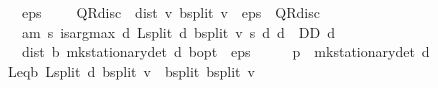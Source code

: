 \begin{isabellebody}
\ \ \ {\isachardoublequoteopen}eps\ {\isachargreater}{\kern0pt}\ {}{\isachardoublequoteclose}\ {\isachardoublequoteopen}{}\ {\isacharasterisk}{\kern0pt}\ QR{\isacharunderscore}{\kern0pt}disc\ {\isacharasterisk}{\kern0pt}\ dist\ v\ {\isacharparenleft}{\kern0pt}{\isasymL}\isactrlsub b{\isacharunderscore}{\kern0pt}split\ v{\isacharparenright}{\kern0pt}\ {\isacharless}{\kern0pt}\ eps\ {\isacharasterisk}{\kern0pt}\ {\isacharparenleft}{\kern0pt}{}{\isacharminus}{\kern0pt}QR{\isacharunderscore}{\kern0pt}disc{\isacharparenright}{\kern0pt}{\isachardoublequoteclose}\isanewline
\ \ \ am{\isacharcolon}{\kern0pt}\ {\isachardoublequoteopen}{\isasymAnd}s{\isachardot}{\kern0pt}\ is{\isacharunderscore}{\kern0pt}arg{\isacharunderscore}{\kern0pt}max\ {\isacharparenleft}{\kern0pt}{\isasymlambda}d{\isachardot}{\kern0pt}\ L{\isacharunderscore}{\kern0pt}split\ d\ {\isacharparenleft}{\kern0pt}{\isasymL}\isactrlsub b{\isacharunderscore}{\kern0pt}split\ v{\isacharparenright}{\kern0pt}\ s{\isacharparenright}{\kern0pt}\ {\isacharparenleft}{\kern0pt}{\isasymlambda}d{\isachardot}{\kern0pt}\ d\ {\isasymin}\ D\isactrlsub D{\isacharparenright}{\kern0pt}\ d{\isachardoublequoteclose}\isanewline
\ \ \ {\isachardoublequoteopen}dist\ {\isacharparenleft}{\kern0pt}{\isasymnu}\isactrlsub b\ {\isacharparenleft}{\kern0pt}mk{\isacharunderscore}{\kern0pt}stationary{\isacharunderscore}{\kern0pt}det\ d{\isacharparenright}{\kern0pt}{\isacharparenright}{\kern0pt}\ {\isasymnu}\isactrlsub b{\isacharunderscore}{\kern0pt}opt\ {\isacharless}{\kern0pt}\ eps{\isachardoublequoteclose}\isanewline
%
\isadelimproof
%
\endisadelimproof
%
\isatagproof
{}\isamarkupfalse%
\ {\isacharminus}{\kern0pt}\isanewline
\ \ \isamarkupfalse%
\ {\isacharquery}{\kern0pt}p\ {\isacharequal}{\kern0pt}\ {\isachardoublequoteopen}mk{\isacharunderscore}{\kern0pt}stationary{\isacharunderscore}{\kern0pt}det\ d{\isachardoublequoteclose}\isanewline
\ \ \isamarkupfalse%
\ L{\isacharunderscore}{\kern0pt}eq{\isacharunderscore}{\kern0pt}{\isasymL}\isactrlsub b{\isacharcolon}{\kern0pt}\ {\isachardoublequoteopen}L{\isacharunderscore}{\kern0pt}split\ d\ {\isacharparenleft}{\kern0pt}{\isasymL}\isactrlsub b{\isacharunderscore}{\kern0pt}split\ v{\isacharparenright}{\kern0pt}\ {\isacharequal}{\kern0pt}\ {\isasymL}\isactrlsub b{\isacharunderscore}{\kern0pt}split\ {\isacharparenleft}{\kern0pt}{\isasymL}\isactrlsub b{\isacharunderscore}{\kern0pt}split\ v{\isacharparenright}{\kern0pt}{\isachardoublequoteclose}\isanewline

\end{isabellebody}
